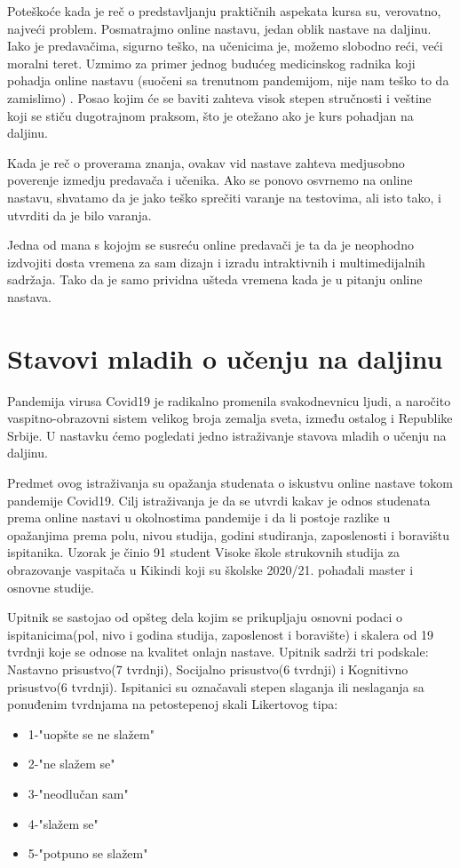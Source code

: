\documentclass{article}
\begin{document}
Poteškoće kada je reč o predstavljanju praktičnih aspekata kursa su, verovatno, najveći problem. Posmatrajmo online nastavu, jedan oblik nastave na daljinu. Iako je predavačima, sigurno teško, na učenicima je, možemo slobodno reći, veći moralni teret. Uzmimo za primer jednog budućeg medicinskog radnika koji pohadja online nastavu (suočeni sa trenutnom pandemijom, nije nam teško to da zamislimo) . Posao kojim će se baviti zahteva visok stepen stručnosti i veštine koji se stiču dugotrajnom praksom, što je otežano ako je kurs pohadjan na daljinu.

Kada je reč o proverama znanja, ovakav vid nastave zahteva medjusobno poverenje izmedju predavača i učenika. Ako se ponovo osvrnemo na online nastavu, shvatamo da je jako teško sprečiti varanje na testovima, ali isto tako, i utvrditi da je bilo varanja. 

Jedna od mana s kojojm se susreću online predavači je ta da je neophodno izdvojiti dosta vremena za sam dizajn i izradu intraktivnih i multimedijalnih sadržaja. Tako da je samo prividna ušteda vremena kada je u pitanju online nastava.

\section{Stavovi mladih o učenju na daljinu}

Pandemija virusa Covid19 je radikalno promenila svakodnevnicu ljudi, a naročito vaspitno-obrazovni sistem velikog broja zemalja sveta, između ostalog i Republike Srbije. U nastavku ćemo pogledati jedno istraživanje stavova mladih o učenju na daljinu.

Predmet ovog istraživanja su opažanja studenata o iskustvu online nastave tokom pandemije Covid19. Cilj istraživanja je da se utvrdi kakav je odnos studenata prema online nastavi u okolnostima pandemije i da li postoje razlike u opažanjima prema polu, nivou studija, godini studiranja, zaposlenosti i boravištu ispitanika. Uzorak je činio 91 student Visoke škole strukovnih studija za obrazovanje vaspitača u Kikindi koji su školske 2020/21. pohađali master i osnovne studije.

Upitnik se sastojao od opšteg dela kojim se prikupljaju osnovni podaci o ispitanicima(pol, nivo i godina studija, zaposlenost i boravište) i skalera od 19 tvrdnji koje se odnose na kvalitet onlajn nastave. Upitnik sadrži tri podskale: Nastavno prisustvo(7 tvrdnji), Socijalno prisustvo(6 tvrdnji) i Kognitivno prisustvo(6 tvrdnji). Ispitanici su označavali stepen slaganja ili neslaganja sa ponuđenim tvrdnjama na petostepenoj skali Likertovog tipa:
\begin{itemize}
    \item 1-"uopšte se ne slažem"
    \item 2-"ne slažem se"
    \item 3-"neodlučan sam"
    \item 4-"slažem se"
    \item 5-"potpuno se slažem"
\end{itemize}
\end{document}
